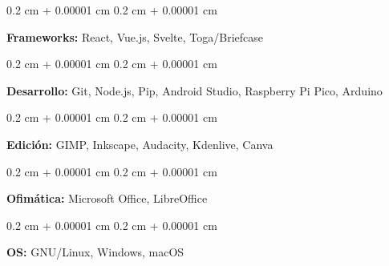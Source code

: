 \documentclass[12pt, letterpaper]{article}
\newenvironment{onecolentry}{
    \begin{adjustwidth}{
        0.2 cm + 0.00001 cm
    }{
        0.2 cm + 0.00001 cm
    }
}{
    \end{adjustwidth}
} %
\begin{document}
\vspace{0.2 cm}

\begin{onecolentry}
    \textbf{Frameworks:} React, Vue.js, Svelte, Toga/Briefcase
\end{onecolentry}

\vspace{0.2 cm}

\begin{onecolentry}
    \textbf{Desarrollo:} Git, Node.js, Pip, Android Studio, Raspberry Pi Pico, Arduino
\end{onecolentry}

\vspace{0.2 cm}

\begin{onecolentry}
    \textbf{Edición:} GIMP, Inkscape, Audacity, Kdenlive, Canva
\end{onecolentry}

\vspace{0.2 cm}

\begin{onecolentry}
    \textbf{Ofimática:} Microsoft Office, LibreOffice
\end{onecolentry}

\vspace{0.2 cm}

\begin{onecolentry}
    \textbf{OS:} GNU/Linux, Windows, macOS
\end{onecolentry}
\end{document}
